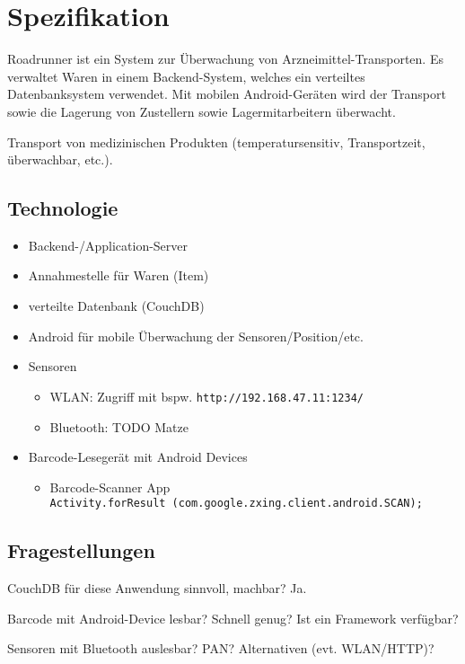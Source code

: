 \section{Spezifikation}
\label{sec:specification}

Roadrunner ist ein System zur Überwachung von Arzneimittel-Transporten. Es verwaltet Waren in einem Backend-System, welches ein verteiltes Datenbanksystem verwendet. Mit mobilen Android-Geräten wird der Transport sowie die Lagerung von Zustellern sowie Lagermitarbeitern überwacht.

Transport von medizinischen Produkten (temperatursensitiv, Transportzeit, überwachbar, etc.).

\subsection{Technologie}

\begin{itemize}
	\item Backend-/Application-Server
	\item Annahmestelle für Waren (Item)
	\item verteilte Datenbank (CouchDB)
	\item Android für mobile Überwachung der Sensoren/Position/etc.
	\item Sensoren
		\begin{itemize}
			\item WLAN: Zugriff mit bspw. \verb=http://192.168.47.11:1234/=
			\item Bluetooth: TODO Matze
		\end{itemize}
	\item Barcode-Lesegerät mit Android Devices
		\begin{itemize}
			\item Barcode-Scanner App\\
			\verb=Activity.forResult (com.google.zxing.client.android.SCAN);=
		\end{itemize}
\end{itemize}

\subsection{Fragestellungen}

CouchDB für diese Anwendung sinnvoll, machbar? Ja.

Barcode mit Android-Device lesbar? Schnell genug? Ist ein Framework verfügbar?

Sensoren mit Bluetooth auslesbar? PAN? Alternativen (evt. WLAN/HTTP)?

